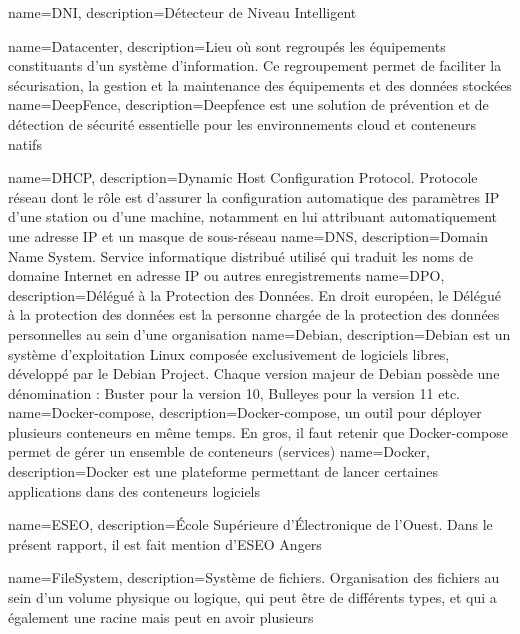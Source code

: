 {
    name=DNI,
    description={Détecteur de Niveau Intelligent}
}

{
    name=Datacenter,
    description={Lieu où sont regroupés les équipements constituants d'un système d'information. Ce regroupement permet de faciliter la sécurisation, la gestion et la maintenance des équipements et des données stockées}
}
{
    name=DeepFence,
    description={Deepfence est une solution de prévention et de détection de sécurité essentielle pour les environnements cloud et conteneurs natifs}
}

{
    name=DHCP,
    description={Dynamic Host Configuration Protocol. Protocole réseau dont le rôle est d’assurer la configuration automatique des paramètres IP d’une station ou d'une machine, notamment en lui attribuant automatiquement une adresse IP et un masque de sous-réseau}
}
{
    name=DNS,
    description={Domain Name System. Service informatique distribué utilisé qui traduit les noms de domaine Internet en adresse IP ou autres enregistrements}
}
{
    name=DPO,
    description={Délégué à la Protection des Données. En droit européen, le Délégué à la protection des données est la personne chargée de la protection des données personnelles au sein d'une organisation}
}
{
    name=Debian,
    description={Debian est un système d’exploitation Linux composée exclusivement de logiciels libres, développé par le Debian Project. Chaque version majeur de Debian possède une dénomination : Buster pour la version 10, Bulleyes pour la version 11 etc.}
}
{
    name=Docker-compose,
    description={Docker-compose, un outil pour déployer plusieurs conteneurs en même temps. En gros, il faut retenir que Docker-compose permet de gérer un ensemble de conteneurs (services)}
}
{
    name=Docker,
    description={Docker est une plateforme permettant de lancer certaines applications dans des conteneurs logiciels}
}

{
    name=ESEO,
    description={École Supérieure d'Électronique de l'Ouest. Dans le présent rapport, il est fait mention d'ESEO Angers}
}

{
    name=FileSystem,
    description={Système de fichiers. Organisation des fichiers au sein d'un volume physique ou logique, qui peut être de différents types, et qui a également une racine mais peut en avoir plusieurs}
}

